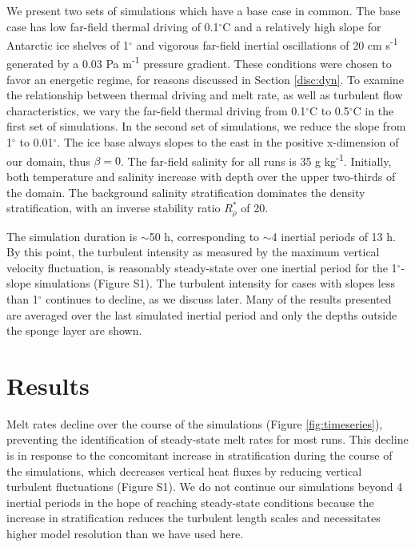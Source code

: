 \documentclass[draft]{agujournal2019}
\begin{document}
We present two sets of simulations which have a base case in common. The base case has low far-field thermal driving of 0.1$^{\circ}$C and a relatively high slope for Antarctic ice shelves of 1$^{\circ}$ and vigorous far-field inertial oscillations of 20 cm s\textsuperscript{-1} generated by a 0.03 Pa m\textsuperscript{-1} pressure gradient. These conditions were chosen to favor an energetic regime, for reasons discussed in Section \ref{disc:dyn}. To examine the relationship between thermal driving and melt rate, as well as turbulent flow characteristics, we vary the far-field thermal driving from 0.1$^{\circ}$C to 0.5$^{\circ}$C in the first set of simulations. In the second set of simulations, we reduce the slope from 1$^{\circ}$ to 0.01$^{\circ}$. The ice base always slopes to the east in the positive x-dimension of our domain, thus $\beta = 0$. The far-field salinity for all runs is 35 g kg\textsuperscript{-1}. Initially, both temperature and salinity increase with depth over the upper two-thirds of the domain. The background salinity stratification dominates the density stratification, with an inverse stability ratio $R_\rho^*$ of 20. 

The simulation duration is $\sim$50 h, corresponding to $\sim$4 inertial periods of 13 h. By this point, the turbulent intensity as measured by the maximum vertical velocity fluctuation, is reasonably steady-state over one inertial period for the 1$^{\circ}$-slope simulations (Figure S1). The turbulent intensity for cases with slopes less than 1$^{\circ}$ continues to decline, as we discuss later. Many of the results presented are averaged over the last simulated inertial period and only the depths outside the sponge layer are shown.




\section{Results}

Melt rates decline over the course of the simulations (Figure \ref{fig:timeseries}), preventing the identification of steady-state melt rates for most runs. This decline is in response to the concomitant increase in stratification during the course of the simulations, which decreases vertical heat fluxes by reducing vertical turbulent fluctuations (Figure S1). We do not continue our simulations beyond 4 inertial periods in the hope of reaching steady-state conditions because the increase in stratification reduces the turbulent length scales and necessitates higher model resolution than we have used here. 
\end{document}
